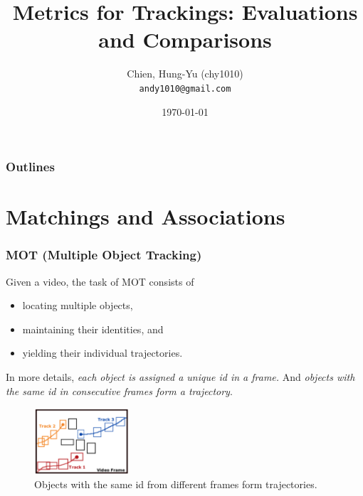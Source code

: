 \documentclass[slidetop, mathserif]{beamer}
\title[Metrics for Tracking]{Metrics for Trackings: Evaluations and Comparisons}
\author[chy1010]{Chien, Hung-Yu (chy1010) \\ {\tt andy1010@gmail.com}}
\date{\today}
\begin{document}
\frame{\titlepage}

\section[Outline]{}
\begin{frame}
	\frametitle{Outlines}
	\tableofcontents
\end{frame}

\section{Matchings and Associations}

\begin{frame}
	\frametitle{MOT (Multiple Object Tracking)}
			
	Given a video, the task of MOT consists of 
	\begin{itemize}
		\item locating multiple objects,
		\item maintaining their identities, and
		\item yielding their individual trajectories.
	\end{itemize}
			
	In more details, \emph{each object is assigned a unique id in a frame.}
	And \emph{objects with the same id in consecutive frames form a trajectory}.
			
	\begin{figure}
		\includegraphics[height=70pt]{pics/fig1.png}
		\caption{Objects with the same id from different frames form trajectories.}
	\end{figure}
			
\end{frame}
\end{document}
